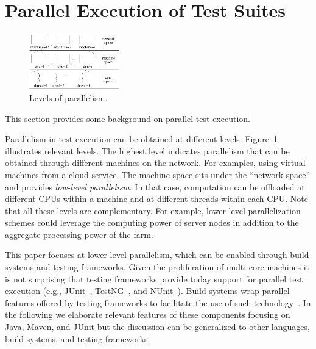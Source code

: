 \section{Parallel Execution of Test Suites}
\label{sec:modes}

\begin{figure}[t!]
  \centering
  \includegraphics[width=0.35\textwidth]{figs/parallel-levels.pdf}
  \vspace{-1ex}
  \caption{\label{fig:levels}Levels of parallelism.}
\end{figure}


This section provides some background on parallel test execution.

Parallelism in test execution can be obtained at different levels.
Figure~\ref{fig:levels} illustrates relevant levels.  The highest
level indicates parallelism that can be obtained through different
machines on the network.  For examples, using virtual machines from a
cloud service.  The machine space sits under the ``network space'' and
provides \emph{low-level parallelism}.  In that case, computation can
be offloaded at different CPUs within a machine and at different
threads within each CPU.  Note that all these levels are
complementary.  For example, lower-level parallelization schemes could
leverage the computing power of server nodes in addition to the
aggregate processing power of the farm.


This paper focuses at lower-level parallelism, which can be enabled 
through build systems and testing frameworks.  Given the proliferation
of multi-core machines it is not surprising that testing frameworks
provide today support for parallel test execution (e.g.,
JUnit~\cite{junit-org}, TestNG~\cite{testng}, and NUnit~\cite{nunit}).
Build systems wrap parallel features offered by testing frameworks to
facilitate the use of such technology~\cite{maven-surefire-plugin}.
In the following we elaborate relevant features of these components
focusing on Java, Maven, and JUnit but the discussion can be
generalized to other languages, build systems, and testing frameworks.


